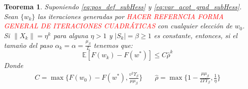 \documentclass{book}
\theoremstyle{plain}
\newtheorem{thm}{Teorema}[section]
\theoremstyle{definition}
\theoremstyle{remark}
\begin{document}
\begin{thm}\label{r-linear}
Suponiendo \ref{eq:pos_def_subHess} y \ref{eq:var_acot_grad_subHess}. Sean $\{w_k\}$ las iteraciones generadas por \textcolor{red}{HACER REFERNCIA FORMA GENERAL DE ITERACIONES CUADRÁTICAS} con cualquier elección de $w_0$. Si $\|X_k\|  = \eta^k$ para alguna $\eta > 1$ y $|S_k| = \beta\geq 1$ es constante, entonces, si el tamaño del paso $\alpha_k = \alpha = \frac{\mu_\beta}{L}$ tenemos que: 
\begin{equation}\label{eq:r-linear}
    \mathbb{E}[F(w_k) - F(w^*)] \leq C\hat{\rho}^k
\end{equation}
Donde
\begin{equation}
   \begin{split}
       C = \max\bigg\{F(w_0) - F(w^*), \frac{v^2\Upsilon_\beta}{\mu\mu_\beta}\bigg\} & \quad \hat{\rho} = \max\bigg\{1- \frac{\mu\mu_\beta}{2\Upsilon\Upsilon_\beta}, \frac{1}{\eta}\bigg\} 
   \end{split}
\end{equation}
\end{thm}
\end{document}
